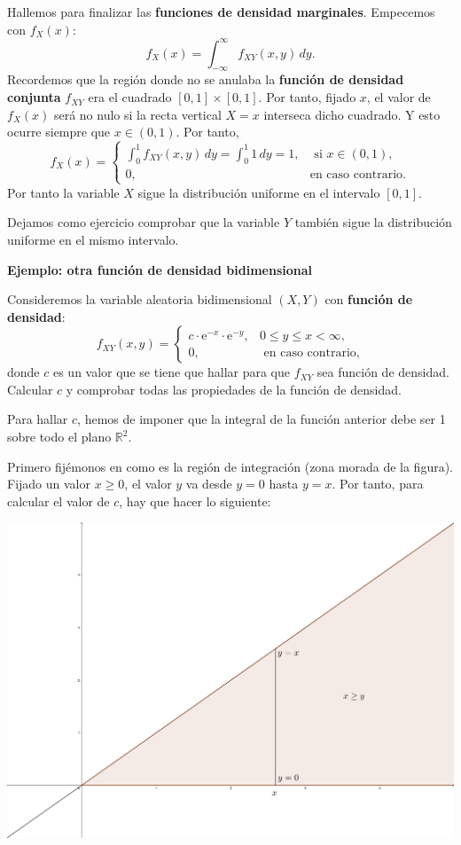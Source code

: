 \documentclass[]{book}
\begin{document}
Hallemos para finalizar las \textbf{funciones de densidad marginales}. Empecemos con \(f_X(x)\):
\[
f_X(x)=\int_{-\infty}^\infty  f_{XY}(x,y)\, dy.
\]
Recordemos que la región donde no se anulaba la \textbf{función de densidad conjunta} \(f_{XY}\) era el cuadrado \([0,1]\times [0,1]\). Por tanto, fijado \(x\), el valor de \(f_X(x)\) será no nulo si la recta vertical \(X=x\) interseca dicho cuadrado. Y esto ocurre siempre que \(x\in (0,1)\). Por tanto,
\[
f_X(x)=\begin{cases}
\int_{0}^1  f_{XY}(x,y)\, dy=\int_{0}^1  1\, dy=1, & \mbox{ si }x\in (0,1),\\
0, & \mbox{en caso contrario.}
\end{cases}
\]
Por tanto la variable \(X\) sigue la distribución uniforme en el intervalo \([0,1]\).

Dejamos como ejercicio comprobar que la variable \(Y\) también sigue la distribución uniforme en el mismo intervalo.

\textbf{Ejemplo: otra función de densidad bidimensional}

Consideremos la variable aleatoria bidimensional \((X,Y)\) con \textbf{función de densidad}:
\[
f_{XY}(x,y)=\begin{cases}
c\cdot \mathrm{e}^{-x}\cdot\mathrm{e}^{-y}, & 0\leq y\leq x < \infty,\\
0, & \mbox{ en caso contrario,}
\end{cases}
\]
donde \(c\) es un valor que se tiene que hallar para que \(f_{XY}\) sea función de densidad. Calcular \(c\) y comprobar todas las propiedades de la función de densidad.

Para hallar \(c\), hemos de imponer que la integral de la función anterior debe ser 1 sobre todo el plano \(\mathbb{R}^2\).

Primero fijémonos en como es la región de integración (zona morada de la figura). Fijado un valor \(x\geq 0\), el valor \(y\) va desde \(y=0\) hasta \(y=x\). Por tanto, para calcular el valor de \(c\), hay que hacer lo siguiente:

\includegraphics{Images/Ejemplo2Bidi.png}
\end{document}
